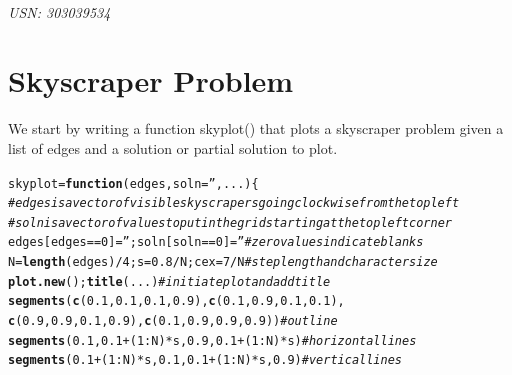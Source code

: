 \documentclass[12pt]{article}\usepackage[]{graphicx}\usepackage[]{color}
\makeatletter
\newcommand{\hlnum}[1]{\textcolor[rgb]{0.686,0.059,0.569}{#1}}%
\newcommand{\hlstr}[1]{\textcolor[rgb]{0.192,0.494,0.8}{#1}}%
\newcommand{\hlcom}[1]{\textcolor[rgb]{0.678,0.584,0.686}{\textit{#1}}}%
\newcommand{\hlopt}[1]{\textcolor[rgb]{0,0,0}{#1}}%
\newcommand{\hlstd}[1]{\textcolor[rgb]{0.345,0.345,0.345}{#1}}%
\newcommand{\hlkwa}[1]{\textcolor[rgb]{0.161,0.373,0.58}{\textbf{#1}}}%
\newcommand{\hlkwb}[1]{\textcolor[rgb]{0.69,0.353,0.396}{#1}}%
\newcommand{\hlkwc}[1]{\textcolor[rgb]{0.333,0.667,0.333}{#1}}%
\newcommand{\hlkwd}[1]{\textcolor[rgb]{0.737,0.353,0.396}{\textbf{#1}}}%
\newenvironment{kframe}{%
 \def\at@end@of@kframe{}%
 \ifinner\ifhmode%
  \def\at@end@of@kframe{\end{minipage}}%
  \begin{minipage}{\columnwidth}%
 \fi\fi%
 \def\FrameCommand##1{\hskip\@totalleftmargin \hskip-\fboxsep
 \colorbox{shadecolor}{##1}\hskip-\fboxsep
     \hskip-\linewidth \hskip-\@totalleftmargin \hskip\columnwidth}%
 \MakeFramed {\advance\hsize-\width
   \@totalleftmargin\z@ \linewidth\hsize
   \@setminipage}}%
 {\par\unskip\endMakeFramed%
 \at@end@of@kframe}
\newenvironment{knitrout}{}{} %
\makeatother
\begin{document}
\begin{center}
\textbf{\Large{}}\\
\textit{USN: 303039534}
\end{center}



\section{Skyscraper Problem}
We start by writing a function skyplot() that plots a skyscraper problem given a list of edges and a solution or partial solution to plot.
\begin{knitrout}
\color{fgcolor}\begin{kframe}
\begin{alltt}
\hlstd{skyplot} \hlkwb{=} \hlkwa{function}\hlstd{(}\hlkwc{edges}\hlstd{,} \hlkwc{soln} \hlstd{=} \hlstr{''}\hlstd{,} \hlkwc{...}\hlstd{)\{}
  \hlcom{#edges is a vector of visible skyscrapers going clockwise from the top left}
  \hlcom{#soln is a vector of values to put in the grid starting at the top left corner}
  \hlstd{edges[edges} \hlopt{==} \hlnum{0}\hlstd{]} \hlkwb{=} \hlstr{''}\hlstd{; soln[soln}\hlopt{==}\hlnum{0}\hlstd{]}\hlkwb{=}\hlstr{''} \hlcom{#zero values indicate blanks}
  \hlstd{N} \hlkwb{=} \hlkwd{length}\hlstd{(edges)} \hlopt{/} \hlnum{4}\hlstd{; s} \hlkwb{=} \hlnum{0.8}\hlopt{/}\hlstd{N; cex} \hlkwb{=} \hlnum{7}\hlopt{/}\hlstd{N} \hlcom{#step length and character size}
  \hlkwd{plot.new}\hlstd{();} \hlkwd{title}\hlstd{(...)} \hlcom{#initiate plot and add title}
  \hlkwd{segments}\hlstd{(} \hlkwd{c}\hlstd{(}\hlnum{0.1}\hlstd{,}\hlnum{0.1}\hlstd{,}\hlnum{0.1}\hlstd{,}\hlnum{0.9}\hlstd{),} \hlkwd{c}\hlstd{(}\hlnum{0.1}\hlstd{,}\hlnum{0.9}\hlstd{,}\hlnum{0.1}\hlstd{,}\hlnum{0.1}\hlstd{),}
            \hlkwd{c}\hlstd{(}\hlnum{0.9}\hlstd{,}\hlnum{0.9}\hlstd{,}\hlnum{0.1}\hlstd{,}\hlnum{0.9}\hlstd{),} \hlkwd{c}\hlstd{(}\hlnum{0.1}\hlstd{,}\hlnum{0.9}\hlstd{,}\hlnum{0.9}\hlstd{,}\hlnum{0.9}\hlstd{) )} \hlcom{#outline}
  \hlkwd{segments}\hlstd{(}\hlnum{0.1}\hlstd{,} \hlnum{0.1}\hlopt{+}\hlstd{(}\hlnum{1}\hlopt{:}\hlstd{N)}\hlopt{*}\hlstd{s,} \hlnum{0.9}\hlstd{,} \hlnum{0.1}\hlopt{+}\hlstd{(}\hlnum{1}\hlopt{:}\hlstd{N)}\hlopt{*}\hlstd{s)} \hlcom{#horizontal lines}
  \hlkwd{segments}\hlstd{(}\hlnum{0.1}\hlopt{+}\hlstd{(}\hlnum{1}\hlopt{:}\hlstd{N)}\hlopt{*}\hlstd{s,} \hlnum{0.1}\hlstd{,} \hlnum{0.1}\hlopt{+}\hlstd{(}\hlnum{1}\hlopt{:}\hlstd{N)}\hlopt{*}\hlstd{s,} \hlnum{0.9}\hlstd{)} \hlcom{#vertical lines}

\end{alltt}
\end{kframe}
\end{knitrout}
\end{document}
